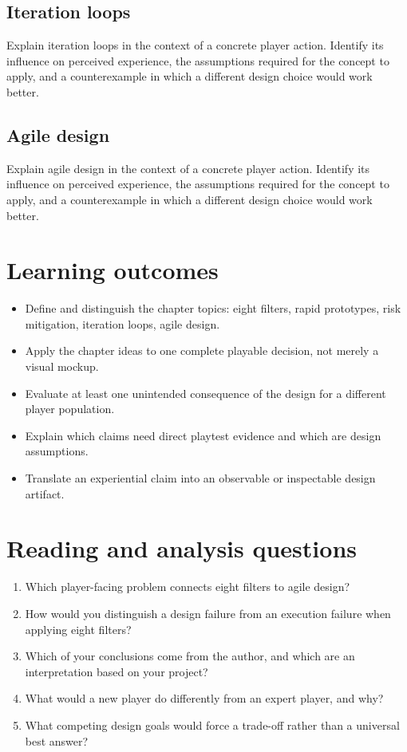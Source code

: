 \documentclass[11pt]{article}
\begin{document}
\subsection{Iteration loops}
Explain iteration loops in the context of a concrete player action. Identify its influence on perceived experience, the assumptions required for the concept to apply, and a counterexample in which a different design choice would work better.


\subsection{Agile design}
Explain agile design in the context of a concrete player action. Identify its influence on perceived experience, the assumptions required for the concept to apply, and a counterexample in which a different design choice would work better.


\section{Learning outcomes}
\begin{itemize}
\item Define and distinguish the chapter topics: eight filters, rapid prototypes, risk mitigation, iteration loops, agile design.
\item Apply the chapter ideas to one complete playable decision, not merely a visual mockup.
\item Evaluate at least one unintended consequence of the design for a different player population.
\item Explain which claims need direct playtest evidence and which are design assumptions.
\item Translate an experiential claim into an observable or inspectable design artifact.
\end{itemize}

\section{Reading and analysis questions}
\begin{enumerate}
\item Which player-facing problem connects eight filters to agile design?
\item How would you distinguish a design failure from an execution failure when applying eight filters?
\item Which of your conclusions come from the author, and which are an interpretation based on your project?
\item What would a new player do differently from an expert player, and why?
\item What competing design goals would force a trade-off rather than a universal best answer?
\end{enumerate}
\end{document}
